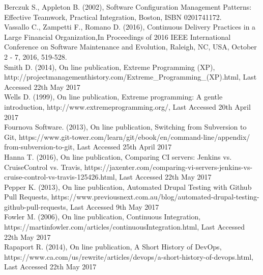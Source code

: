 \begin{thebibliography}{0}


Berczuk S., Appleton B. (2002), Software Configuration Management Patterns: Effective Teamwork, Practical Integration, Boston, ISBN 0201741172.
\\
Vassallo C., Zampetti F., Romano D. (2016), Continuous Delivery Practices in a Large Financial Organization,In Proceedings of 2016 IEEE International Conference on Software Maintenance and Evolution, Raleigh, NC, USA, October 2 - 7, 2016, 519-528.
\\
Smith D. (2014), On line publication, Extreme Programming (XP), http://projectmanagementhistory.com/Extreme\_Programming\_(XP).html, Last Accessed 22th May 2017
\\
Wells D. (1999), On line publication, Extreme programming: A gentle introduction, http://www.extremeprogramming.org/, Last Accessed 20th April 2017
\\
Fournova Software. (2013), On line publication, Switching from Subversion to Git, https://www.git-tower.com/learn/git/ebook/en/command-line/appendix/\\from-subversion-to-git, Last Accessed 25th April 2017
\\
Hanna T. (2016), On line publication, Comparing CI servers: Jenkins vs. CruiseControl vs. Travis, https://jaxenter.com/comparing-vi-servers-jenkins-vs-cruise-control-vs-travis-125426.html, Last Accessed 22th May 2017
\\
Pepper K. (2013), On line publication, Automated Drupal Testing with Github Pull Requests, https://www.previousnext.com.au/blog/automated-drupal-testing-github-pull-requests, Last Accessed 9th May 2017
\\
Fowler M. (2006),  On line publication, Continuous Integration, https://martinfowler.com/articles/continuousIntegration.html, Last Accessed 22th May 2017
\\
Rapaport R. (2014), On line publication, A Short History of DevOps, https://www.ca.com/us/rewrite/articles/devops/a-short-history-of-devops.html, Last Accessed 22th May 2017
\\

\end{thebibliography}
